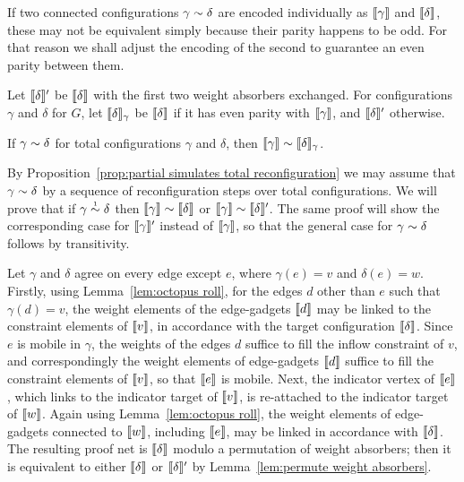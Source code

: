\documentclass[conference]{IEEEtran}
\begin{document}
If two connected configurations $\gamma\perm\delta$ are encoded individually as $\llbracket\gamma\rrbracket$ and $\llbracket\delta\rrbracket$, these may not be equivalent simply because their parity happens to be odd.
%
For that reason we shall adjust the encoding of the second to guarantee an even parity between them.

\begin{definition}
%
Let $\llbracket\delta\rrbracket'$ be $\llbracket\delta\rrbracket$ with the first two weight absorbers exchanged.
%
For configurations $\gamma$ and $\delta$ for $G$, let $\llbracket\delta\rrbracket_\gamma$ be $\llbracket\delta\rrbracket$ if it has even parity with $\llbracket\gamma\rrbracket$, and $\llbracket\delta\rrbracket'$ otherwise.
%
\end{definition}



\begin{lemma}
\label{lem:completeness}
If $\gamma\perm\delta$ for total configurations $\gamma$ and $\delta$, then $\itn\gamma\perm\itn\delta_\gamma$.
\end{lemma}

\begin{IEEEproof}
By Proposition~\ref{prop:partial simulates total reconfiguration} we may assume that $\gamma\perm\delta$ by a sequence of reconfiguration steps over total configurations.
%
We will prove that if $\gamma\perm*\delta$ then $\itn\gamma\perm\itn\delta$ or $\itn\gamma\perm\itn\delta'$.
%
The same proof will show the corresponding case for $\llbracket\gamma\rrbracket'$ instead of $\llbracket\gamma\rrbracket$, so that the general case for $\gamma\perm\delta$ follows by transitivity.



Let $\gamma$ and $\delta$ agree on every edge except $e$, where $\gamma(e)=v$ and $\delta(e)=w$.
%
Firstly, using Lemma~\ref{lem:octopus roll}, for the edges $d$ other than $e$ such that $\gamma(d)=v$, the weight elements of the edge-gadgets $\llbracket d\rrbracket$ may be linked to the constraint elements of $\llbracket v\rrbracket$, in accordance with the target configuration $\llbracket\delta\rrbracket$.
%
Since $e$ is mobile in $\gamma$, the weights of the edges $d$ suffice to fill the inflow constraint of $v$, and correspondingly the weight elements of edge-gadgets $\llbracket d\rrbracket$ suffice to fill the constraint elements of $\llbracket v\rrbracket$, so that $\llbracket e\rrbracket$ is mobile.
%
Next, the indicator vertex of $\llbracket e\rrbracket$, which links to the indicator target of $\llbracket v\rrbracket$, is re-attached to the indicator target of $\llbracket w\rrbracket$.
%
Again using Lemma~\ref{lem:octopus roll}, the weight elements of edge-gadgets connected to $\llbracket w\rrbracket$, including $\llbracket e\rrbracket$, may be linked in accordance with $\llbracket\delta\rrbracket$.
%
The resulting proof net is $\llbracket\delta\rrbracket$ modulo a permutation of weight absorbers; then it is equivalent to either $\llbracket\delta\rrbracket$ or $\llbracket\delta\rrbracket'$ by Lemma~\ref{lem:permute weight absorbers}.
\end{IEEEproof}
\end{document}

